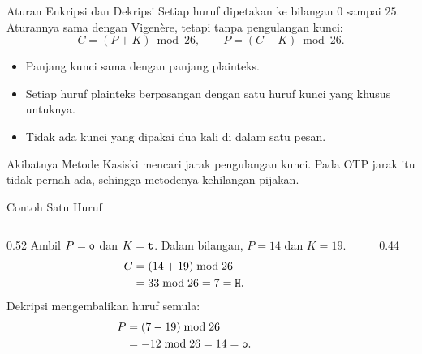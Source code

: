 \documentclass[aspectratio=169,11pt]{beamer}
\begin{document}
\begin{frame}{Aturan Enkripsi dan Dekripsi}
    \footnotesize
    Setiap huruf dipetakan ke bilangan $0$ sampai $25$. Aturannya sama
    dengan Vigen\`ere, tetapi tanpa pengulangan kunci:
    \[
        C = (P + K) \bmod 26, \qquad
        P = (C - K) \bmod 26 .
    \]
    \begin{itemize}
        \item Panjang kunci sama dengan panjang plainteks.
        \item Setiap huruf plainteks berpasangan dengan satu huruf kunci
              yang khusus untuknya.
        \item Tidak ada kunci yang dipakai dua kali di dalam satu pesan.
    \end{itemize}
    \vspace{0.1cm}
    \begin{exampleblock}{Akibatnya}
        Metode Kasiski mencari jarak pengulangan kunci. Pada OTP jarak itu
        tidak pernah ada, sehingga metodenya kehilangan pijakan.
    \end{exampleblock}
\end{frame}

\begin{frame}{Contoh Satu Huruf}
    \begin{columns}[T,onlytextwidth]
        \begin{column}{0.52\textwidth}
            \footnotesize
            Ambil $P=\texttt{o}$ dan $K=\texttt{t}$. Dalam bilangan,
            $P=14$ dan $K=19$.
            \begin{align*}
                C &= (14+19) \bmod 26 \\
                  &= 33 \bmod 26 = 7 = \texttt{H}.
            \end{align*}
            Dekripsi mengembalikan huruf semula:
            \begin{align*}
                P &= (7-19) \bmod 26 \\
                  &= -12 \bmod 26 = 14 = \texttt{o}.
            \end{align*}
        \end{column}
        \begin{column}{0.44\textwidth}
            \centering
        \end{column}
    \end{columns}
\end{frame}
\end{document}
